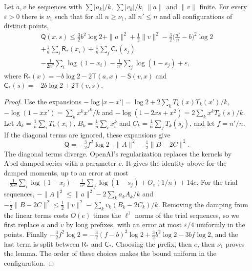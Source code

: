 \begin{lemma}\label{lem:freetangent}
Let $a,v$ be sequences with $\sum|a_k|/k$, $\sum|v_k|/k$, $\|a\|$ and $\|v\|$ finite. For every $\varepsilon>0$ there is $\nu_1$ such that
for all $n\ge\nu_1$, all $n'\le n$ and all configurations of distinct points,
\begin{multline*}
 \mathsf Q(x,s)\le\tfrac32b^2\log2+\|a\|^2+\tfrac12\|v\|^2-\tfrac32\bigl(\tfrac{n'}n-b\bigr)^2\log2\\
 +\frac1n\sum_i\mathsf R_*(x_i)+\frac1n\sum_j\mathsf C_*(s_j)\\
 -\frac1{2n^2}\sum_i\log(1-x_i)-\frac1{n^2}\sum_j\log(1-s_j)+\varepsilon,
\end{multline*}
where $\mathsf R_*(x)=-b\log2-2\mathsf T(a,x)-\mathsf S(v,x)$ and $\mathsf C_*(s)=-2b\log2+2\mathsf T(v,s)$.
\end{lemma}

\begin{proof}
Use the expansions $-\log|x-x'|=\log2+2\sum_kT_k(x)T_k(x')/k$, $-\log(1-xx')=\sum_kx^kx'^k/k$ and
$-\log(1-2xs+x^2)=2\sum_kx^kT_k(s)/k$. Let $A_k=\frac1n\sum_iT_k(x_i)$, $B_k=\frac1n\sum_ix_i^k$ and $C_k=\frac1n\sum_jT_k(s_j)$, and let $f=n'/n$.
If the diagonal terms are ignored, these expansions give
\[
 \mathsf Q=-\tfrac32f^2\log2-\|A\|^2-\tfrac12\|B-2C\|^2 .
\]
The diagonal terms diverge. OpenAI's regularization \cite[\S5]{OpenAI2026} replaces the kernels by Abel-damped series with a parameter $e$.
It gives the identity above for the damped moments, up to an error at most
$-\frac1{2n^2}\sum_i\log(1-x_i)-\frac1{n^2}\sum_j\log(1-s_j)+O_e(1/n)+14e$. For the trial sequences, $-\|A\|^2\le\|a\|^2-2\sum_ka_kA_k/k$ and
$-\frac12\|B-2C\|^2\le\frac12\|v\|^2-\sum_kv_k(B_k-2C_k)/k$. Removing the damping from the linear terms costs $O(e)$ times the $\ell^1$ norms of the trial
sequences, so we first replace $a$ and $v$ by long prefixes, with an error at most $\varepsilon/4$ uniformly in the points. Finally
$-\frac32f^2\log2=-\frac32(f-b)^2\log2+\frac32b^2\log2-3bf\log2$, and the last term is split between $\mathsf R_*$ and $\mathsf C_*$. Choosing the prefix, then $e$, then $\nu_1$
proves the lemma. The order of these choices makes the bound uniform in the configuration.
\end{proof}


